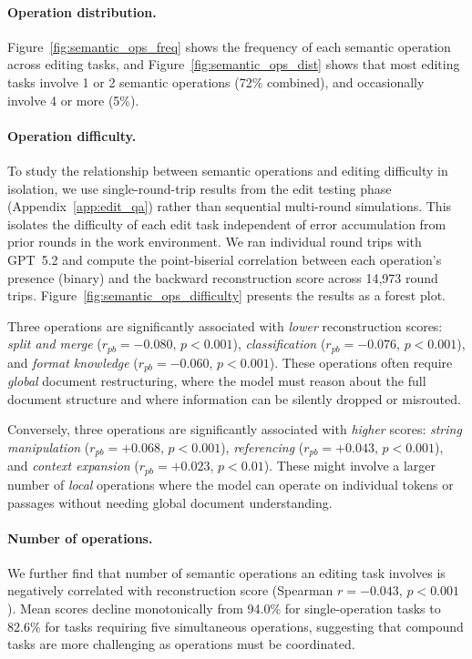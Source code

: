 \documentclass{article} %
\begin{document}
\paragraph{Operation distribution.} Figure~\ref{fig:semantic_ops_freq} shows the frequency of each semantic operation across editing tasks, and Figure~\ref{fig:semantic_ops_dist} shows that most editing tasks involve 1 or 2 semantic operations (72\% combined), and occasionally involve 4 or more (5\%).

\paragraph{Operation difficulty.} To study the relationship between semantic operations and editing difficulty in isolation, we use single-round-trip results from the edit testing phase (Appendix~\ref{app:edit_qa}) rather than sequential multi-round simulations. This isolates the difficulty of each edit task independent of error accumulation from prior rounds in the work environment. We ran individual round trips with GPT~5.2 and compute the point-biserial correlation between each operation's presence (binary) and the backward reconstruction score across 14,973 round trips. Figure~\ref{fig:semantic_ops_difficulty} presents the results as a forest plot.

Three operations are significantly associated with \textit{lower} reconstruction scores: \textit{split and merge} ($r_{pb} = {-}0.080$, $p < 0.001$), \textit{classification} ($r_{pb} = {-}0.076$, $p < 0.001$), and \textit{format knowledge} ($r_{pb} = {-}0.060$, $p < 0.001$). These operations often require \textit{global} document restructuring, where the model must reason about the full document structure and where information can be silently dropped or misrouted.

Conversely, three operations are significantly associated with \textit{higher} scores: \textit{string manipulation} ($r_{pb} = {+}0.068$, $p < 0.001$), \textit{referencing} ($r_{pb} = {+}0.043$, $p < 0.001$), and \textit{context expansion} ($r_{pb} = {+}0.023$, $p < 0.01$). These might involve a larger number of \textit{local} operations where the model can operate on individual tokens or passages without needing global document understanding.

\paragraph{Number of operations.} We further find that number of semantic operations an editing task involves is negatively correlated with reconstruction score (Spearman $r = {-}0.043$, $p < 0.001$). Mean scores decline monotonically from 94.0\% for single-operation tasks to 82.6\% for tasks requiring five simultaneous operations, suggesting that compound tasks are more challenging as operations must be coordinated.
\end{document}
